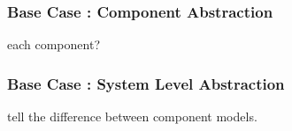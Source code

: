 

\begin{frame}[ctb!]
  \frametitle{Base Case : Component Abstraction}
  each component?
\end{frame}


\begin{frame}[ctb!]
  \frametitle{Base Case : System Level Abstraction}
  tell the difference between component models.
  
\end{frame}
